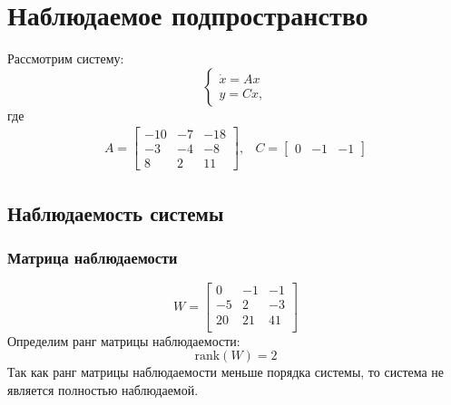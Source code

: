 \section{Наблюдаемое подпространство}

Рассмотрим систему: 
\begin{equation}
    \begin{cases}
        \dot{x} = Ax \\
        y = Cx,
    \end{cases}
\end{equation}
где 
\begin{equation}
    \begin{array}{cc}
        A = \begin{bmatrix}
            -10 & -7 & -18 \\
            -3 & -4 & -8 \\
            8 & 2 & 11
        \end{bmatrix}, &
        C = \begin{bmatrix}
            0 & -1 & -1
        \end{bmatrix}
    \end{array}
\end{equation}

\subsection{Наблюдаемость системы}
\subsubsection{Матрица наблюдаемости}
\begin{equation}
    W = \begin{bmatrix}
        0  & -1  & -1 \\ 
        -5  & 2  & -3 \\ 
        20  & 21  & 41 \\ 
        \end{bmatrix}
\end{equation}
Определим ранг матрицы наблюдаемости:
\begin{equation}
    \text{rank}(W) = 2
\end{equation}
Так как ранг матрицы наблюдаемости меньше порядка системы, то система не является полностью наблюдаемой. 

